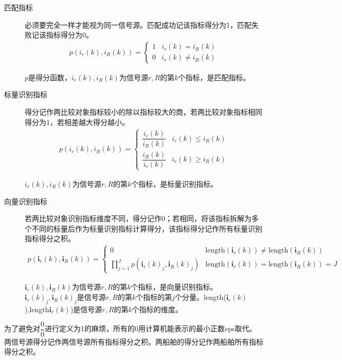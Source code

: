 \begin{description}
	\item[匹配指标]必须要完全一样才能视为同一信号源。匹配成功记该指标得分为1，匹配失败记该指标得分为0。
	\begin{align}
		p(i_r(k),i_R(k))=
		\begin{cases}
			1	&	i_r(k)=i_R(k)	\\
			0	&	i_r(k)\neq i_R(k)
		\end{cases}
	\end{align}
	\par \(p\)是得分函数，\(i_r(k),i_R(k)\)为信号源\(r,R\)的第\(k\)个指标，是匹配指标。
	\item[标量识别指标]得分记作两比较对象指标较小的除以指标较大的商，若两比较对象指标相同得分为1，若相差越大得分越小。
	\begin{align}
		p(i_r(k),i_R(k))=
		\begin{cases}
			\dfrac{i_r(k)}{i_R(k)}	&	i_r(k)\leqslant i_R(k)	\\
			\dfrac{i_R(k)}{i_r(k)}	&	i_r(k)\geqslant i_R(k)
		\end{cases}
	\end{align}
	\par \(i_r(k),i_R(k)\)为信号源\(r,R\)的第\(k\)个指标，是标量识别指标。
	\item[向量识别指标]若两比较对象识别指标维度不同，得分记作0；若相同，将该指标拆解为多个不同的标量后作为标量识别指标计算得分，该指标得分记作所有标量识别指标得分之积。
	\begin{align}
		p(\bm{i}_r(k),\bm{i}_R(k))=
		\begin{cases}
			0										&	\mathrm{length}(\bm{i}_r(k))\neq\mathrm{length}(\bm{i}_R(k))		\\
			\prod\limits_{j=1}^{J}p(\bm{i}_r(k)_j,\bm{i}_R(k)_j)	&	\mathrm{length}(\bm{i}_r(k))=\mathrm{length}(\bm{i}_R(k))=J
		\end{cases}
	\end{align}
	\par \(\bm{i}_r(k),\bm{i}_R(k)\)为信号源\(r,R\)的第\(k\)个指标，是向量识别指标。\(\bm{i}_r(k)_j,\bm{i}_R(k)_j\)是信号源\(r,R\)的第\(k\)个指标的第\(j\)个分量。length(\(\bm{i}_r(k)\)),length\(\bm{i}_r(k)\))是信号源\(r,R\)的第\(k\)个指标的维度。
\end{description}
\par 为了避免对\(\dfrac{0}{0}\)进行定义为1的麻烦，所有的0用计算机能表示的最小正数eps取代。
\\\indent 两信号源得分记作两信号源所有指标得分之积。两船舶的得分记作两船舶所有指标得分之积。
